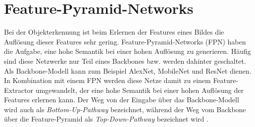 \section{Feature-Pyramid-Networks}
Bei der Objekterkennung ist beim Erlernen der Features eines Bildes die
Auflösung dieser Features sehr gering. Feature-Pyramid-Networks (FPN) haben die
Aufgabe, eine hohe Semantik bei einer hohen Auflösung zu generieren. Häufig sind
diese Netzwerke nur Teil eines Backbones bzw. werden dahinter geschaltet. Als
Backbone-Modell kann zum Beispiel AlexNet, MobileNet und ResNet dienen. In
Kombination mit einem FPN werden diese Netze damit zu einem Feature-Extractor
umgewandelt, der eine hohe Semantik bei einer hohen Auflösung der Features
erlernen kann. Der Weg von der Eingabe über das Backbone-Modell wird auch als
\textit{Bottom-Up-Pathway} bezeichnet, während der Weg vom Backbone über die
Feature-Pyramid als \textit{Top-Down-Pathway} bezeichnet wird
\cite{lin2017feature}.

